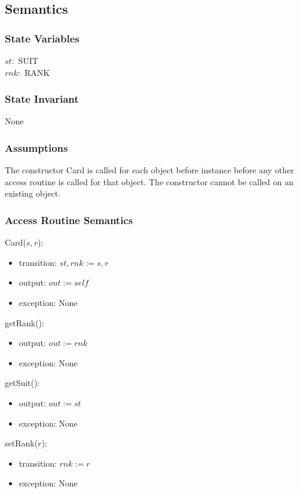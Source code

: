 \documentclass[12pt]{article}
\begin{document}
\subsection* {Semantics}

\subsubsection* {State Variables}
$st:$ SUIT\\
$rnk:$ RANK


\subsubsection* {State Invariant}

None
\subsubsection* {Assumptions}

The constructor Card is called for each object before instance before any other access routine is called for that object. The constructor cannot be called on an existing object.

\subsubsection* {Access Routine Semantics}

Card($s, r$):
\begin{itemize}
\item transition: $st,rnk := s, r$
\item output: $out := \mathit{self}$
\item exception: None
\end{itemize}

\noindent getRank():
\begin{itemize}
\item output: $out := rnk$
\item exception: None
\end{itemize}

\noindent getSuit():
\begin{itemize}
\item output: $out := st$
\item exception: None
\end{itemize}

\noindent setRank($r$):
\begin{itemize}
\item transition: $rnk := r$
\item exception: None
\end{itemize}
\end{document}
